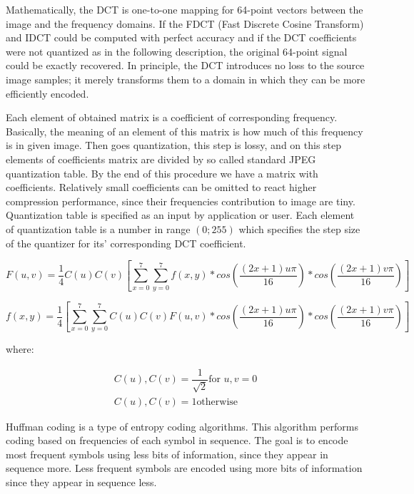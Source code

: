 Mathematically, the DCT is one-to-one mapping for 64-point vectors between the image and the frequency domains. If the FDCT (Fast Discrete Cosine Transform) and IDCT could be computed with perfect accuracy and if the DCT coefficients were not quantized as in the following description, the original 64-point signal could be exactly recovered. In principle, the DCT introduces no loss to the source image samples; it merely transforms them to a domain in which they can be more efficiently encoded.

Each element of obtained matrix is a coefficient of corresponding frequency. Basically, the meaning of an element of this matrix is how much of this frequency is in given image. Then goes quantization, this step is lossy, and on this step elements of coefficients matrix are divided by so called standard JPEG quantization table. By the end of this procedure we have a matrix with coefficients. Relatively small coefficients can be omitted to react higher compression performance, since their frequencies contribution to image are tiny. Quantization table is specified as an input by application or user. Each element of quantization table is a number in range $(0; 255)$ which specifies the step size of the quantizer for its' corresponding DCT coefficient.

\begin{equation}
    \label{eq:00}
    F(u,v)=\dfrac{1}{4}C(u)C(v)[\sum_{x=0}^{7}\sum_{y=0}^{7}{f(x,y)*cos(\dfrac{(2x+1)u\pi}{16})*cos(\dfrac{(2x+1)v\pi}{16})}]
\end{equation}

\begin{equation}
    \label{eq:01}
    f(x,y)=\dfrac{1}{4}[\sum_{x=0}^{7}\sum_{y=0}^{7}{C(u)C(v)F(u,v)*cos(\dfrac{(2x+1)u\pi}{16})*cos(\dfrac{(2x+1)v\pi}{16})}]
\end{equation}

where:

\begin{equation}
    \label{eq:02}
    \begin{split}
        C(u), C(v) = \dfrac{1}{\sqrt{2}} \text{for } u,v=0 \\
        C(u), C(v) = 1 \text{otherwise}
    \end{split}
\end{equation}

Huffman coding is a type of entropy coding algorithms. This algorithm performs coding based on frequencies of each symbol in sequence. The goal is to encode most frequent symbols using less bits of information, since they appear in sequence more. Less frequent symbols are encoded using more bits of information since they appear in sequence less.

